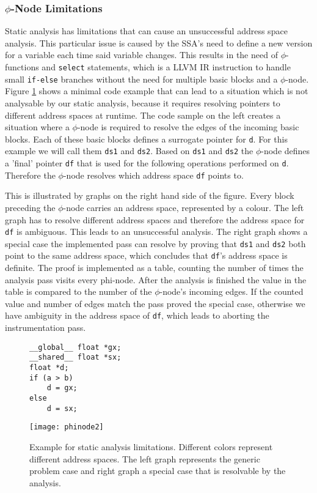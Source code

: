 \subsubsection{$\phi$-Node Limitations}\label{patho}
Static analysis has limitations that can cause an unsuccessful address space analysis. This particular issue is caused by the SSA's need to define a new version for a variable each time said variable changes. This results in the need of $\phi$-functions and \verb|select| statements, which is a LLVM IR instruction to handle small \verb|if-else| branches without the need for multiple basic blocks
and a $\phi$-node. Figure \ref{phinodes} shows a minimal code example that can lead to a situation which is not analysable by our static analysis, because it requires resolving pointers to different address spaces at runtime. The code sample on the left creates a situation where a $\phi$-node is required to resolve the edges of the incoming basic blocks. Each of these basic blocks defines a surrogate pointer for \verb|d|. For this example we will call them \verb|ds1| and \verb|ds2|. Based on \verb|ds1| and \verb|ds2| the $\phi$-node defines a 'final' pointer \verb|df| that is used for the following operations performed on \verb|d|. Therefore the $\phi$-node resolves which address space \verb|df| points to. 

This is illustrated by graphs on the right hand side of the figure. Every block preceding the $\phi$-node carries an address space, represented by a colour.
The left graph has to resolve different address spaces and therefore the address space for \verb|df| is ambiguous. This leads to an unsuccessful analysis. The right graph shows a special case the implemented pass can resolve by proving that \verb|ds1| and \verb|ds2| both point to the same address space, which concludes that \verb|df|'s address space is definite. The proof is implemented as a table, counting the number of times the analysis pass visits every phi-node. After the analysis is finished the value in the table is compared to the number of the $\phi$-node's incoming edges. If the counted value and number of edges match the pass proved the special case, otherwise we have ambiguity in the address space of \verb|df|, which leads to aborting the instrumentation pass.

\begin{figure}[t]
		\begin{minipage}{0.35\textwidth}

		\begin{lstlisting}[style=c]
__global__ float *gx;
__shared__ float *sx;
float *d;
if (a > b)
	d = gx;
else 
	d = sx;	\end{lstlisting}
			\end{minipage}\hfill
	\begin{minipage}{0.6\textwidth}
		\centering
		\texttt{[image: phinode2]}
	\end{minipage}\hfill
	\caption[$\phi$-node Limitations]{Example for static analysis limitations. Different colors represent different address spaces. The left graph represents the generic problem case and right graph a special case that is resolvable by the analysis.}
	\label{phinodes}
\end{figure}

